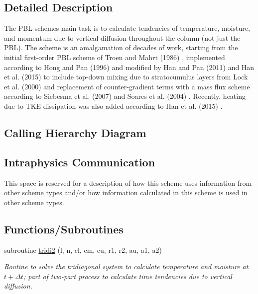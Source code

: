 \subsection{Detailed Description}
The P\+BL scheme\textquotesingle{}s main task is to calculate tendencies of temperature, moisture, and momentum due to vertical diffusion throughout the column (not just the P\+BL). The scheme is an amalgamation of decades of work, starting from the initial first-\/order P\+BL scheme of Troen and Mahrt (1986) \cite{troen_and_mahrt_1986}, implemented according to Hong and Pan (1996) \cite{hong_and_pan_1996} and modified by Han and Pan (2011) \cite{han_and_pan_2011} and Han et al. (2015) \cite{han_et_al_2015} to include top-\/down mixing due to stratocumulus layers from Lock et al. (2000) \cite{lock_et_al_2000} and replacement of counter-\/gradient terms with a mass flux scheme according to Siebesma et al. (2007) \cite{siebesma_et_al_2007} and Soares et al. (2004) \cite{soares_et_al_2004}. Recently, heating due to T\+KE dissipation was also added according to Han et al. (2015) \cite{han_et_al_2015}.\hypertarget{group___g_f_s___n_s_s_t_diagram}{}\subsection{Calling Hierarchy Diagram}\label{group___g_f_s___n_s_s_t_diagram}
 \hypertarget{group___g_f_s___n_s_s_t_intraphysics}{}\subsection{Intraphysics Communication}\label{group___g_f_s___n_s_s_t_intraphysics}
This space is reserved for a description of how this scheme uses information from other scheme types and/or how information calculated in this scheme is used in other scheme types. \subsection*{Functions/\+Subroutines}
\begin{DoxyCompactItemize}
\item 
subroutine \hyperlink{group___h_e_d_m_e_ga80bebdc639adaba3ed0ed2ea2f24315e}{tridi2} (l, n, cl, cm, cu, r1, r2, au, a1, a2)
\begin{DoxyCompactList}\small\item\em Routine to solve the tridiagonal system to calculate temperature and moisture at $ t + \Delta t $; part of two-\/part process to calculate time tendencies due to vertical diffusion. \end{DoxyCompactList}\end{DoxyCompactItemize}
